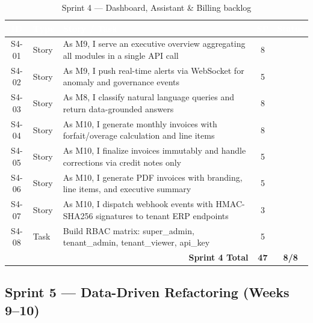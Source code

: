 \documentclass[12pt,a4paper,twoside]{report}
\newcommand{\cmark}{\ding{51}}
\begin{document}
\begin{table}[H]
\centering
\small
\begin{tabularx}{\textwidth}{|c|l|X|c|c|}
\hline
\rowcolor{tabheader}
\textcolor{white}{\textbf{ID}} &
\textcolor{white}{\textbf{Type}} &
\textcolor{white}{\textbf{Story / Task}} &
\textcolor{white}{\textbf{SP}} &
\textcolor{white}{\textbf{Status}} \\
\hline
S4-01 & Story & As M9, I serve an executive overview aggregating all modules in a single API call & 8 & \cmark \\
\hline
S4-02 & Story & As M9, I push real-time alerts via WebSocket for anomaly and governance events & 5 & \cmark \\
\hline
S4-03 & Story & As M8, I classify natural language queries and return data-grounded answers & 8 & \cmark \\
\hline
S4-04 & Story & As M10, I generate monthly invoices with forfait/overage calculation and line items & 8 & \cmark \\
\hline
S4-05 & Story & As M10, I finalize invoices immutably and handle corrections via credit notes only & 5 & \cmark \\
\hline
S4-06 & Story & As M10, I generate PDF invoices with branding, line items, and executive summary & 5 & \cmark \\
\hline
S4-07 & Story & As M10, I dispatch webhook events with HMAC-SHA256 signatures to tenant ERP endpoints & 3 & \cmark \\
\hline
S4-08 & Task & Build RBAC matrix: super\_admin, tenant\_admin, tenant\_viewer, api\_key & 5 & \cmark \\
\hline
\multicolumn{3}{|r|}{\textbf{Sprint 4 Total}} & \textbf{47} & \textbf{8/8} \\
\hline
\end{tabularx}
\caption{Sprint 4 — Dashboard, Assistant \& Billing backlog}
\end{table}

\subsection{Sprint 5 — Data-Driven Refactoring (Weeks 9--10)}
\end{document}

